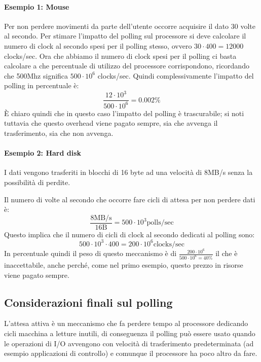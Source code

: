 \documentclass[class=book, crop=false, oneside]{standalone}
\begin{document}
\paragraph{Esempio 1: Mouse} Per non perdere movimenti da parte dell'utente occorre acquisire il dato 30 volte al secondo. Per stimare l'impatto del polling sul processore si deve calcolare il numero di clock al secondo spesi per il polling stesso, ovvero \(30\cdot 400 = 12000\) clocks/sec. Ora che abbiamo il numero di clock spesi per il polling ci basta calcolare a che percentuale di utilizzo del processore corrispondono, ricordando che 500Mhz significa \(500\cdot10^{6}\) clocks/sec. Quindi complessivamente l'impatto del polling in percentuale è:
\begin{equation*}
	\frac{12\cdot 10^3}{500\cdot 10^6}=0.002\%
\end{equation*}
È chiaro quindi che in questo caso l'impatto del polling è trascurabile; si noti tuttavia che questo overhead viene pagato sempre, sia che avvenga il trasferimento, sia che non avvenga.

\paragraph{Esempio 2: Hard disk} I dati vengono trasferiti in blocchi di 16 byte ad una velocità di \unit{8}{MB/s} senza la possibilità di perdite.

Il numero di volte al secondo che occorre fare cicli di attesa per non perdere dati è:
\begin{equation*}
	\frac{8\textrm{MB/s}}{16\textrm{B}} = 500\cdot10^{3} \textrm{polls/sec}
\end{equation*}
Questo implica che il numero di cicli di clock al secondo dedicati al polling sono:
\begin{equation*}
	500\cdot10^{3}\cdot400 = 200\cdot10^{6} \textrm{clocks/sec}
\end{equation*}
In percentuale quindi il peso di questo meccanismo è di \(\frac{200\cdot10^6}{500\cdot10^6=40\%}\) il che è inaccettabile, anche perché, come nel primo esempio, questo prezzo in risorse viene pagato sempre.

\subsection{Considerazioni finali sul polling}
L'attesa attiva è un meccanismo che fa perdere tempo al processore dedicando cicli macchina a letture inutili, di conseguenza il polling può essere usato quando le operazioni di I/O avvengono con velocità di trasferimento predeterminata (ad esempio applicazioni di controllo) e comunque il processore ha poco altro da fare.
\end{document}
